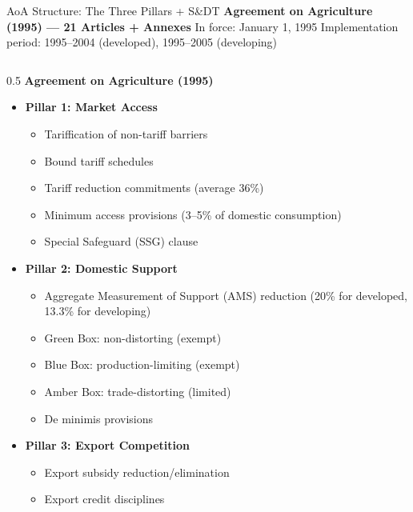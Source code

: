 \documentclass[
  ignorenonframetext,
  aspectratio=169,
]{beamer}
\makeatletter
\providecommand{\tightlist}{%
  \setlength{\itemsep}{0pt}\setlength{\parskip}{0pt}}
\let\quarto@originallabel\label
\DeclareRobustCommand*{\label}[1]{\quarto@originallabel{#1}}
\makeatother
\begin{document}
\begin{frame}{AoA Structure: The Three Pillars + S\&DT}
\label{aoa-structure-the-three-pillars-sdt}
\textbf{Agreement on Agriculture (1995) --- 21 Articles + Annexes} In
force: January 1, 1995 \textbar{} Implementation period: 1995--2004
(developed), 1995--2005 (developing)

\begin{columns}[T]
\begin{column}{0.5\linewidth}
\textbf{Agreement on Agriculture (1995)}

\begin{itemize}
\tightlist
\item
  \textbf{Pillar 1: Market Access}

  \begin{itemize}
  \tightlist
  \item
    Tariffication of non-tariff barriers
  \item
    Bound tariff schedules
  \item
    Tariff reduction commitments (average 36\%)
  \item
    Minimum access provisions (3--5\% of domestic consumption)
  \item
    Special Safeguard (SSG) clause
  \end{itemize}
\item
  \textbf{Pillar 2: Domestic Support}

  \begin{itemize}
  \tightlist
  \item
    Aggregate Measurement of Support (AMS) reduction (20\% for
    developed, 13.3\% for developing)
  \item
    Green Box: non-distorting (exempt)
  \item
    Blue Box: production-limiting (exempt)
  \item
    Amber Box: trade-distorting (limited)
  \item
    De minimis provisions
  \end{itemize}
\item
  \textbf{Pillar 3: Export Competition}

  \begin{itemize}
  \tightlist
  \item
    Export subsidy reduction/elimination
  \item
    Export credit disciplines
  \end{itemize}
\end{itemize}
\end{column}


\end{columns}
\end{frame}
\end{document}
